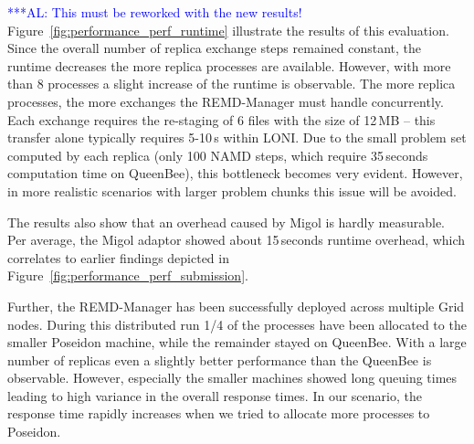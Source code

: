 \documentclass[times, 10pt, twocolumn]{article}
\newcommand{\alnote}[1]{ {\textcolor{blue} { ***AL: #1 }}}
\newcommand{\alnote}[1]{}
\begin{document}
\alnote{This must be reworked with the new results!}
Figure~\ref{fig:performance_perf_runtime} illustrate the results of
this evaluation. Since the overall number of replica exchange steps remained constant,
the runtime decreases the more replica processes are available. However, with more than 8 processes a slight increase 
of the runtime is observable. 
The more replica processes, the more exchanges the REMD-Manager must handle
concurrently. Each exchange requires the re-staging of 6 files with the size of 12\,MB -- this transfer alone typically 
requires 5-10\,s within LONI. Due to the small problem set computed by each 
replica (only 100 NAMD steps, which require 35\,seconds computation time on QueenBee), 
this bottleneck becomes very evident. However, in more realistic scenarios with larger problem chunks
this issue will be avoided.  


The results also show that an overhead caused by Migol is hardly measurable. 
Per average, the Migol adaptor showed 
about 15\,seconds runtime overhead, which correlates
to earlier findings depicted in Figure~\ref{fig:performance_perf_submission}. 



Further, the REMD-Manager has been successfully deployed across
multiple Grid nodes. During this distributed run 1/4 of the processes have been 
allocated to the smaller Poseidon machine, while the remainder stayed on QueenBee.
With a large number of replicas even a slightly better performance than the QueenBee 
is observable. However, especially the smaller machines showed long queuing times 
leading to high variance in the overall response
times. In our scenario, the response time rapidly increases when we tried to allocate 
more processes to Poseidon. 
\end{document}
